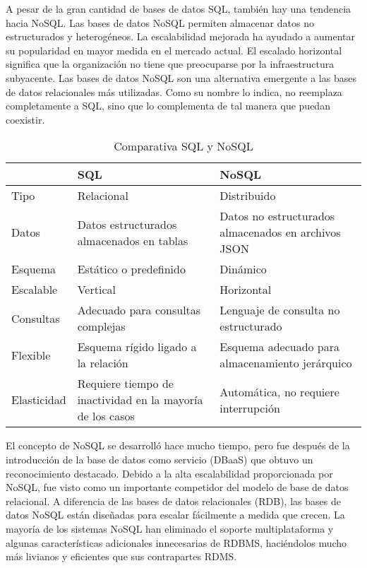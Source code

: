 A pesar de la gran cantidad de bases de datos SQL, también hay una tendencia hacia NoSQL. Las bases de datos NoSQL permiten almacenar datos no estructurados y heterogéneos. La escalabilidad mejorada ha ayudado a aumentar su popularidad en mayor medida en el mercado actual. El escalado horizontal significa que la organización no tiene que preocuparse por la infraestructura subyacente. Las bases de datos NoSQL son una alternativa emergente a las bases de datos relacionales más utilizadas. Como su nombre lo indica, no reemplaza completamente a SQL, sino que lo complementa de tal manera que puedan coexistir.
\vspace{0.8cm}

\begin{table}[H]
  \renewcommand{\arraystretch}{1.5}
  \centering
  \scriptsize
  \begin{tabular}{ |p{2cm}||p{5cm}|p{5cm}|  }
    \hline
      & SQL
      & NoSQL \\
    \hline
    Tipo
      & Relacional
      & Distribuido \\
    \hline
    Datos
      & Datos estructurados almacenados en tablas 
      & Datos no estructurados almacenados en archivos JSON \\
    \hline
    Esquema 
      & Estático o predefinido
      & Dinámico \\
    \hline
    Escalable 
      & Vertical
      & Horizontal \\
    \hline
    Consultas
      & Adecuado para consultas complejas 
      & Lenguaje de consulta no estructurado \\
    \hline
    Flexible
      & Esquema rígido ligado a la relación 
      & Esquema adecuado para almacenamiento jerárquico \\
    \hline
    Elasticidad
      & Requiere tiempo de inactividad en la mayoría de los casos 
      & Automática, no requiere interrupción \\
    \hline
  \end{tabular}
  \caption{Comparativa SQL y NoSQL}
\end{table}
\vspace{0.8cm}

El concepto de NoSQL se desarrolló hace mucho tiempo, pero fue después de la introducción de la base de datos como servicio (DBaaS) que obtuvo un reconocimiento destacado. Debido a la alta escalabilidad proporcionada por NoSQL, fue visto como un importante competidor del modelo de base de datos relacional. A diferencia de las bases de datos relacionales (RDB), las bases de datos NoSQL están diseñadas para escalar fácilmente a medida que crecen. La mayoría de los sistemas NoSQL han eliminado el soporte multiplataforma y algunas características adicionales innecesarias de RDBMS, haciéndolos mucho más livianos y eficientes que sus contrapartes RDMS.


